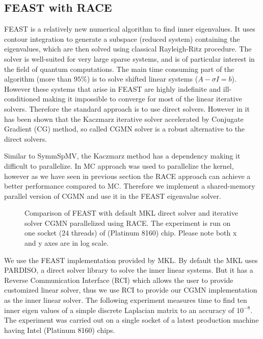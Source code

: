 \subsection{FEAST with RACE}
FEAST\cite{FEAST} is a relatively new numerical algorithm to find inner eigenvalues.
It uses contour integration to generate a subspace (reduced system) containing the eigenvalues,
which are then solved using classical Rayleigh-Ritz procedure. The solver is
well-suited for very large sparse systems, and is of particular interest in the field
of quantum computations.
 The main time consuming part of the algorithm (more than $95\%$) is to solve 
 shifted linear systems ($A- \sigma I = b$). However these systems
 that arise in FEAST are highly indefinite and ill-conditioned making it impossible
 to converge for most of the linear iterative solvers. Therefore the standard approach
 is to use direct solvers. However in \cite{feast_mc} it has been shown
 that the Kaczmarz iterative solver accelerated by Conjugate Gradient (CG) method,
 so called CGMN solver is a robust alternative to the direct solvers. 
 
Similar to \acrshort{SymmSpMV}, the Kaczmarz method has a \DTWO dependency making
it difficult to parallelize. In \cite{feast_mc} \acrshort{MC} approach was used to
parallelize the kernel, however as we have seen in previous section the \acrshort{RACE}
approach can achieve a better performance compared to \acrshort{MC}. Therefore
we implement a shared-memory parallel version of CGMN and use it in the FEAST eigenvalue
solver.

  \setlength{\belowcaptionskip}{-15pt}
\begin{figure}[tb]
	\centering
	\scalebox{0.56}{}
	\caption{\label{fig:feast} Comparison of FEAST with default \acrshort{MKL} direct solver and 
		iterative solver CGMN parallelized using \acrshort{RACE}. The experiment is
		run on one socket ($24$ threads) of \SKX (Platinum 8160) chip. Please note both x and y axes
		are in log scale.}
\end{figure}
  \setlength{\belowcaptionskip}{0pt}
  
We use the FEAST implementation provided by \acrshort{MKL}. By default the MKL
uses PARDISO, a direct solver library to solve the inner linear systems. 
But it has a Reverse Communication Interface (RCI) which allows the user to provide 
customized linear solver, thus we use RCI to provide our CGMN implementation as the inner 
linear solver. The following experiment measures time to find ten inner eigen values 
of a simple discrete Laplacian matrix to an accuracy of $10^{-8}$. The experiment
was carried out on a single socket of a latest production machine having 
Intel \SKX (Platinum 8160) chips.

